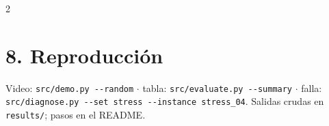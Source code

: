\documentclass[9pt,a4paper]{extarticle}
\begin{document}
\begin{multicols}{2}
\section{8. Reproducción}
Video: \texttt{src/demo.py -{}-random} $\cdot$ tabla: \texttt{src/evaluate.py -{}-summary} $\cdot$ falla: \texttt{src/diagnose.py -{}-set stress -{}-instance stress\_04}. Salidas crudas en \texttt{results/}; pasos en el \mbox{README}.

\end{multicols}
\end{document}
